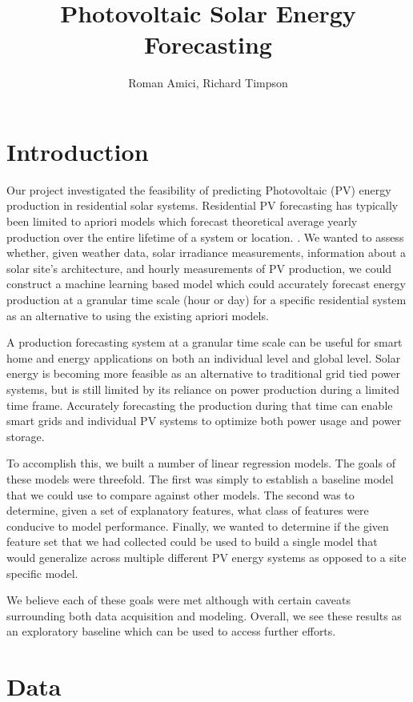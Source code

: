 \documentclass[11pt, fullpage,letterpaper]{article}
\title{Photovoltaic Solar Energy Forecasting}
\author{Roman Amici, Richard Timpson}
\begin{document}
\maketitle

\section{Introduction}

Our project investigated the feasibility of predicting Photovoltaic (PV) energy production in residential solar systems. Residential PV forecasting has typically been limited to apriori models which forecast theoretical average yearly production over the entire lifetime of a system or location. \cite{SAM}. We wanted to assess whether, given weather data, solar irradiance measurements, information about a solar site’s architecture, and hourly measurements of PV production, we could construct a machine learning based model which could accurately forecast energy production at a granular time scale (hour or day) for a specific residential system as an alternative to using the existing apriori models.

A production forecasting system at a granular time scale can be useful for smart home and energy applications on both an individual level and global level. Solar energy is becoming more feasible as an alternative to traditional grid tied power systems, but is still limited by its reliance on power production during a limited time frame. Accurately forecasting the production during that time can enable smart grids and individual PV systems to optimize both power usage and power storage. 

To accomplish this, we built a number of linear regression models. The goals of these models were threefold. The first was simply to establish a baseline model that we could use to compare against other models. The second was to determine, given a set of explanatory features, what class of features were conducive to model performance. Finally, we wanted to determine if the given feature set that we had collected could be used to build a single model that would generalize across multiple different PV energy systems as opposed to a site specific model. 

We believe each of these goals were met although with certain caveats surrounding both data acquisition and modeling. Overall, we see these results as an exploratory baseline which can be used to access further efforts.

\section{Data}
\end{document}
